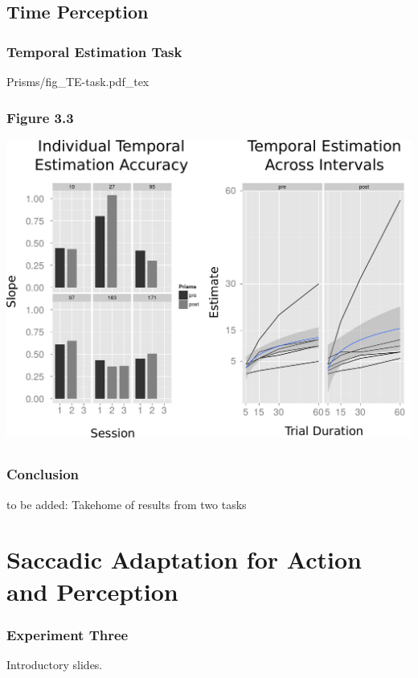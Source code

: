 \documentclass{beamer}
\begin{document}
 \subsection*{Time Perception}
  \begin{frame}
	 \frametitle{Temporal Estimation Task}
  \def\svgwidth{0.9\textwidth}
  {Prisms/fig_TE-task.pdf_tex}
 \end{frame}




\subsection*{}
 \begin{frame}
	 \frametitle{Conclusion}
    to be added: Takehome of results from two tasks 
 \end{frame}


\section[Saccadic Adaptation]{Saccadic Adaptation for Action and Perception} 

 \begin{frame}
  \frametitle{Experiment Three}
 Introductory slides. 
 \end{frame}
\end{document}
